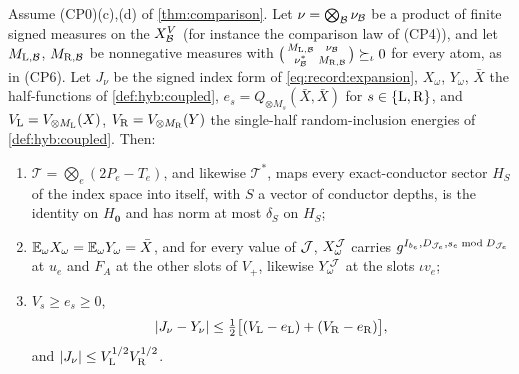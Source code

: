 \begin{corollary}
\label{cor:index-support-frame}
Assume (CP0)(c),(d) of \cref{thm:comparison}. Let
$\nu=\bigotimes_\mathcal B\nu_\mathcal B$ be a product of finite signed measures on the
$X_\mathcal B^V$ (for instance the comparison law of (CP4)), and let
$M_{{\rm L},\mathcal B}$, $M_{{\rm R},\mathcal B}$ be nonnegative measures with
$\bigl(\begin{smallmatrix}M_{{\rm L},\mathcal B}&\nu_\mathcal B\\ \nu_\mathcal B^*&M_{{\rm R},\mathcal B}
\end{smallmatrix}\bigr)\succeq_\iota0$ for every atom, as in (CP6). Let $J_\nu$
be the signed index form of \eqref{eq:record:expansion}, $X_\omega$,
$Y_\omega$, $\bar X$ the half-functions of \cref{def:hyb:coupled},
$e_s=Q_{\otimes M_s}(\bar X,\bar X)$ for $s\in\{{\rm L},{\rm R}\}$, and
$V_{\rm L}=V_{\otimes M_{\rm L}}(X)$, $V_{\rm R}=V_{\otimes M_{\rm R}}(Y)$ the
single-half random-inclusion energies of \cref{def:hyb:coupled}. Then:
\begin{enumerate}[label=(\roman*)]
\item $\mathcal T=\bigotimes_e(2P_e-T_e)$, and likewise $\mathcal T^*$, maps
 every exact-conductor sector $H_S$ of the index space into itself, with
 $S$ a vector of conductor depths, is the identity on
 $H_{\boldsymbol0}$ and has norm at most $\delta_S$ on $H_S$;
\item $\mathbb E_\omega X_\omega=\mathbb E_\omega Y_\omega=\bar X$, and for every value of
 $\mathcal J$, $X^\mathcal J_\omega$ carries $g^{I_{b_e},D_{\mathcal J_e},s_e\bmod D_{\mathcal J_e}}$ at $u_e$
 and $F_A$ at the other slots of $V_+$, likewise $Y^\mathcal J_\omega$ at the slots
 $\iota v_e$;
\item $V_s\ge e_s\ge0$,
 \begin{equation}\label{eq:index-support-frame}
  |J_\nu-Y_\nu|\le\tfrac12\bigl[(V_{\rm L}-e_{\rm L})+(V_{\rm R}-e_{\rm R})\bigr],
 \end{equation}
 and $|J_\nu|\le V_{\rm L}^{1/2}V_{\rm R}^{1/2}$.
\end{enumerate}
\end{corollary}

